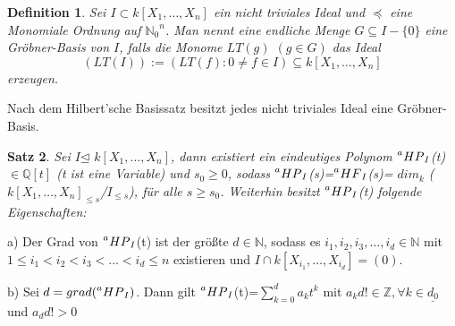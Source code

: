 \documentclass{article}
\newtheorem{satz}{Satz}
\newtheorem{definition}[satz]{Definition}
\newcommand*{\R}{k[X_{1},\ldots,X_{n}]}
\newcommand*{\indx}[2]{{#1}_{#2}}
\newcommand*{\potx}[2]{{#1}^{#2}}
\newcommand*{\N}{\mathbb{N}_0}
\newcommand*{\hf}[1]{$\prescript{a}{}{HF}_{#1}$}
\newcommand*{\hp}[1]{$\prescript{a}{}{HP}_{#1}$}
\newcommand*{\kette}[2]{$1\leq {#1}_1<{#1}_2<{#1}_3<...<{#1}_{#2}\leq n$}
\newcommand*{\dkette}[2]{${#1}_1,{#1}_2,{#1}_3,\ldots,{#1}_{#2} \in \mathbb{N}$}
\newcommand*{\ideal}{$I$}
\begin{document}
\begin{definition}
	Sei $I\subset \R$ ein nicht triviales Ideal und $\preceq$ eine Monomiale Ordnung auf $\potx{\N}{n}$. Man nennt eine endliche Menge $G\subseteq I-\{0\}$ eine Gröbner-Basis von $I$, falls die Monome $LT(g)$ $(g\in G)$ das Ideal 
	\begin{displaymath}
	(LT(I)):=(LT(f):0\neq f\in I)\subseteq \R
	\end{displaymath}
	erzeugen. 
\end{definition}
Nach dem Hilbert'sche Basissatz besitzt jedes nicht triviales Ideal eine Gröbner-Basis.\\

\begin{satz}
	\label{1.2.14}
	Sei  \ideal $\unlhd$ $\R$, dann existiert ein eindeutiges Polynom \hp{I}(t) $\in \mathbb{Q}[t]$ (t ist eine Variable) und $\indx{s}{0}\geq0$,  sodass \hp{I}(s)=\hf{I}(s)= $\indx{dim}{k}$ ($\indx{\R}{\leq s}$/$\indx{I}{\leq s}$), für alle $ s\geq\indx{s}{0}$. Weiterhin besitzt \hp{I}(t) folgende Eigenschaften:	
\end{satz}
\begin{compactenum}
	\item[a)] Der Grad von \hp{I}(t) ist der größte $d \in \mathbb{N}$, sodass es \dkette{i}{d} mit \kette{i}{d} existieren und $I\cap k[X_{{i}_{1}},\ldots,X_{{i}_{d}}]=(0)$.
	\item[b)] Sei $d=grad(\textnormal{\hp{I}})$. Dann gilt \hp{I}(t)=$\sum_{k=0}^{d} \indx{a}{k}t^k$ mit $\indx{a}{k}d! \in \mathbb{Z}, \forall k\in \underline{\indx{d}{0}}$ und $\indx{a}{d}d!>0$
\end{compactenum}
\end{document}
